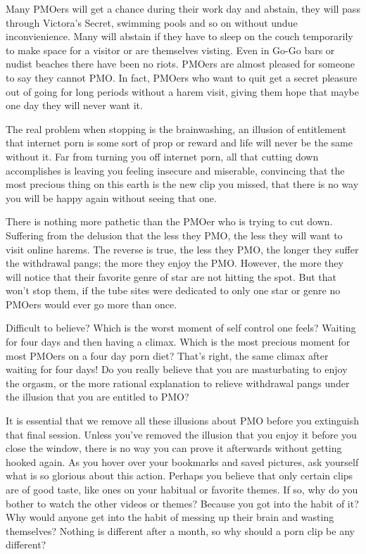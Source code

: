 Many PMOers will get a chance during their work day and abstain, they will pass through Victora's Secret, swimming pools and so on without undue inconvienience. Many will abstain if they have to sleep on the couch temporarily to make space for a visitor or are themselves visting. Even in Go-Go bars or nudist beaches there have been no riots. PMOers are almost pleased for someone to say they cannot PMO. In fact, PMOers who want to quit get a secret pleasure out of going for long periods without a harem visit, giving them hope that maybe one day they will never want it.

The real problem when stopping is the brainwashing, an illusion of entitlement that internet porn is some sort of prop or reward and life will never be the same without it. Far from turning you off internet porn, all that cutting down accomplishes is leaving you feeling insecure and miserable, convincing that the most precious thing on this earth is the new clip you missed, that there is no way you will be happy again without seeing that one.

There is nothing more pathetic than the PMOer who is trying to cut down. Suffering from the delusion that the less they PMO, the less they will want to visit online harems. The reverse is true, the less they PMO, the longer they suffer the withdrawal pangs; the more they enjoy the PMO. However, the more they will notice that their favorite genre of star are not hitting the spot. But that won't stop them, if the tube sites were dedicated to only one star or genre no PMOers would ever go more than once.

Difficult to believe? Which is the worst moment of self control one feels? Waiting for four days and then having a climax. Which is the most precious moment for most PMOers on a four day porn diet? That's right, the same climax after waiting for four days! Do you really believe that you are masturbating to enjoy the orgasm, or the more rational explanation to relieve withdrawal pangs under the illusion that you are entitled to PMO?

It is essential that we remove all these illusions about PMO before you extinguish that final session. Unless you've removed the illusion that you enjoy it before you close the window, there is no way you can prove it afterwards without getting hooked again. As you hover over your bookmarks and saved pictures, ask yourself what is so glorious about this action. Perhaps you believe that only certain clips are of good taste, like ones on your habitual or favorite themes. If so, why do you bother to watch the other videos or themes? Because you got into the habit of it? Why would anyone get into the habit of messing up their brain and wasting themselves? Nothing is different after a month, so why should a porn clip be any different?

